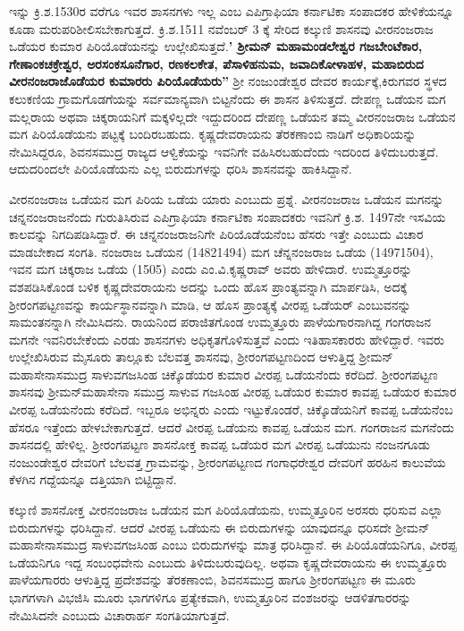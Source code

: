 ಇನ್ನು ಕ್ರಿ.ಶ.1530ರ ವರೆಗೂ ಇವರ ಶಾಸನಗಳು ಇಲ್ಲ ಎಂಬ ಎಪಿಗ್ರಾಫಿಯಾ ಕರ್ನಾಟಿಕಾ ಸಂಪಾದಕರ ಹೇಳಿಕೆಯನ್ನೂ ಕೂಡಾ ಮರುಪರಿಶೀಲಿಸಬೇಕಾಗುತ್ತದೆ. ಕ್ರಿ.ಶ.1511 ನವೆಂಬರ್​ 3 ಕ್ಕೆ ಸೇರಿದ ಕಲ್ಕುಣಿ ಶಾಸನವು ವೀರನಂಜರಾಜ ಒಡೆಯರ ಕುಮಾರ ಪಿರಿಯೊಡೆಯನನ್ನು ಉಲ್ಲೇಖಿಸುತ್ತದೆ.\textbf{' ಶ‍್ರೀಮನ್​ ಮಹಾಮಂಡಲೇಶ್ವರ ಗಜಬೇಂಟೆಕಾರ, ಗೇಣಾಂಕಚಕ್ರೇಶ್ವರ, ಅರಸಂಕಸೂನೆಗಾರ, ರಣಕಲಕೇತ, ಪೆಸಾಳಿಹನುಮ, ಜವಾದಿಕೋಳಾಹಳ, ಮಹಾಬಿರುದ\general{\break } ವೀರನಂಜರಾಜೊಡೆಯರ ಕುಮಾರರು ಪಿರಿಯೊಡೆಯರು''} ಶ‍್ರೀ ನಂಜುಂಡೇಶ್ವರ ದೇವರ ಕಾರ್ಯಕ್ಕೆ,ಕಿರುಗವರ ಸ್ಥಳದ ಕಲುಕಣಿಯ ಗ್ರಾಮಗೊಡಗೆಯನ್ನು ಸರ್ವಮಾನ್ಯವಾಗಿ ಬಿಟ್ಟನೆಂದು ಈ ಶಾಸನ ತಿಳಿಸುತ್ತದೆ. ದೇಪಣ್ಣ ಒಡೆಯನ ಮಗ ಮಲ್ಲರಾಯ ಅಥವಾ ಚಿಕ್ಕರಾಯನಿಗೆ ಮಕ್ಕಳಿಲ್ಲದೇ ಇದ್ದುದರಿಂದ ದೇಪಣ್ಣ ಒಡೆಯನ ತಮ್ಮ ವೀರನಂಜರಾಜ ಒಡೆಯನ ಮಗ ಪಿರಿಯೊಡೆಯನು ಪಟ್ಟಕ್ಕೆ ಬಂದಿರಬಹುದು. ಕೃಷ್ಣದೇವರಾಯನು ತೆರಕಣಾಂಬಿ ನಾಡಿಗೆ ಅಧಿಕಾರಿಯನ್ನು ನೇಮಿಸಿದ್ದರೂ, ಶಿವನಸಮುದ್ರ ರಾಜ್ಯದ ಆಳ್ವಿಕೆಯನ್ನು ಇವನಿಗೇ ವಹಿಸಿರಬಹುದೆಂದು ಇದರಿಂದ ತಿಳಿದುಬರುತ್ತದೆ. ಆದುದರಿಂದಲೇ ಪಿರಿಯೊಡೆಯನು ಎಲ್ಲ ಬಿರುದುಗಳನ್ನು ಧರಿಸಿ ಶಾಸನವನ್ನು ಹಾಕಿಸಿದ್ದಾನೆ.

ವೀರನಂಜರಾಜ ಒಡೆಯನ ಮಗ ಪಿರಿಯ ಒಡೆಯ ಯಾರು ಎಂಬುದು ಪ್ರಶ್ನೆ. ವೀರನಂಜರಾಜ ಒಡೆಯನ ಮಗನನ್ನು ಚನ್ನನಂಜರಾಜನೆಂದು ಗುರುತಿಸಿರುವ ಎಪಿಗ್ರಾಫಿಯಾ ಕರ್ನಾಟಿಕಾ ಸಂಪಾದಕರು ಇವನಿಗೆ ಕ್ರಿ.ಶ. 1497ನೇ ಇಸವಿಯ ಕಾಲವನ್ನು ನಿಗದಿಪಡಿಸಿದ್ದಾರೆ. ಈ ಚನ್ನನಂಜರಾಜನಿಗೇ ಪಿರಿಯೊಡೆಯನೆಂಬ ಹೆಸರು ಇತ್ತೇ ಎಂಬುದು ವಿಚಾರ ಮಾಡಬೇಕಾದ ಸಂಗತಿ. ನಂಜರಾಜ ಒಡೆಯನ (1482\enginline{-}1494) ಮಗ ಚೆನ್ನನಂಜರಾಜ ಒಡೆಯ (1497\enginline{-}1504), ಇವನ ಮಗ ಚಿಕ್ಕರಾಜ ಒಡೆಯ (1505) ಎಂದು ಎಂ.ವಿ.ಕೃಷ್ಣರಾವ್​ ಅವರು ಹೇಳಿದಾರೆ. ಉಮ್ಮತ್ತೂರನ್ನು ವಶಪಡಿಸಿಕೊಂಡ ಬಳಿಕ ಕೃಷ್ಣದೇವರಾಯನು ಅದನ್ನು ಒಂದು ಹೊಸ ಪ್ರಾಂತ್ಯವನ್ನಾಗಿ ಮಾರ್ಪಡಿಸಿ, ಅದಕ್ಕೆ ಶ‍್ರೀರಂಗಪಟ್ಟಣವನ್ನು ಕಾರ್ಯಸ್ಥಾನವನ್ನಾಗಿ ಮಾಡಿ, ಆ ಹೊಸ ಪ್ರಾಂತ್ಯಕ್ಕೆ ವೀರಪ್ಪ ಒಡೆಯರ್​ ಎಂಬುವನನ್ನು ಸಾಮಂತನನ್ನಾಗಿ ನೇಮಿಸಿದನು. ರಾಯನಿಂದ ಪರಾಜಿತಗೊಂಡ ಉಮ್ಮತ್ತೂರು ಪಾಳೆಯಗಾರನಾಗಿದ್ದ ಗಂಗರಾಜನ ಮಗನೇ ಇವನಿರಬೇಕೆಂದು ಎರಡು ಶಾಸನಗಳು ಅಧಿಕೃತಗೊಳಿಸುತ್ತವೆ ಎಂದು ಇತಿಹಾಸಕಾರರು ಹೇಳಿದ್ದಾರೆ. ಇವರು ಉಲ್ಲೇಖಿಸಿರುವ ಮೈಸೂರು ತಾಲ್ಲೂಕು ಬೆಲವತ್ತ ಶಾಸನವು, ಶ‍್ರೀರಂಗಪಟ್ಟಣದಿಂದ ಆಳುತ್ತಿದ್ದ ಶ‍್ರೀಮನ್​ ಮಹಾಸೇನಾಸಮುದ್ರ ಸಾಳುವಗಜಸಿಂಹ ಚಿಕ್ಕೊಡೆಯರ ಕುಮಾರ ವೀರಪ್ಪ ಒಡೆಯನೆಂದು ಕರೆದಿದೆ. ಶ‍್ರೀರಂಗಪಟ್ಟಣ ಶಾಸನವು ಶ‍್ರೀಮನ್​ ಮಹಾಸೇನಾ ಸಮುದ್ರ ಸಾಳುವ ಗಜಸಿಂಹ ವೀರಪ್ಪ ಒಡೆಯರ ಕುಮಾರ ಕಾವಪ್ಪ ಒಡೆಯರ ಕುಮಾರ ವೀರಪ್ಪ ಒಡೆಯನೆಂದು ಕರೆದಿದೆ. ಇಬ್ಬರೂ ಅಭಿನ್ನರು ಎಂದು ಇಟ್ಟುಕೊಂಡರೆ, ಚಿಕ್ಕೊಡೆಯನಿಗೆ ಕಾವಪ್ಪ ಒಡೆಯನೆಂಬ ಹೆಸರೂ ಇತ್ತೆಂದು ಹೇಳಬೇಕಾಗುತ್ತದೆ. ಆದರೆ ವೀರಪ್ಪ ಒಡೆಯನು ಕಾವಪ್ಪ ಒಡೆಯನ ಮಗ. ಗಂಗರಾಜನ ಮಗನೆಂದು ಶಾಸನದಲ್ಲಿ ಹೇಳಿಲ್ಲ. ಶ‍್ರೀರಂಗಪಟ್ಟಣ ಶಾಸನೋಕ್ತ ಕಾವಪ್ಪ ಒಡೆಯರ ಮಗ ವೀರಪ್ಪ ಒಡೆಯುನು ನಂಜನಗೂಡು ನಂಜುಂಡೇಶ್ವರ ದೇವರಿಗೆ ಬೆಲವತ್ತ ಗ್ರಾಮವನ್ನು, ಶ‍್ರೀರಂಗಪಟ್ಟಣದ ಗಂಗಾಧರೇಶ್ವರ ದೇವರಿಗೆ ಹರಹಿನ ಕಾಲುವೆಯ ಕೆಳಗಿನ ಗದ್ದೆಯನ್ನೂ ದತ್ತಿಯಾಗಿ ಬಿಟ್ಟಿದ್ದಾನೆ.

ಕಲ್ಕುಣಿ ಶಾಸನೋಕ್ತ ವೀರನಂಜರಾಜ ಒಡೆಯನ ಮಗ ಪಿರಿಯೊಡೆಯನು, ಉಮ್ಮತ್ತೂರಿನ ಅರಸರು ಧರಿಸುವ ಎಲ್ಲಾ ಬಿರುದುಗಳನ್ನು ಧರಿಸಿದ್ದಾನೆ. ಆದರೆ ವೀರಪ್ಪ ಒಡೆಯನು ಈ ಬಿರುದುಗಳನ್ನು ಯಾವುದನ್ನೂ ಧರಿಸದೇ ಶ‍್ರೀಮನ್​ ಮಹಾಸೇನಾಸಮುದ್ರ ಸಾಳುವಗಜಸಿಂಹ ಎಂಬು ಬಿರುದುಗಳನ್ನು ಮಾತ್ರ ಧರಿಸಿದ್ದಾನೆ. ಈ ಪಿರಿಯೊಡೆಯನಿಗೂ, ವೀರಪ್ಪ ಒಡೆಯನಿಗೂ ಇದ್ದ ಸಂಬಂಧವೇನು ಎಂಬುದು ತಿಳಿದುಬರುವುದಿಲ್ಲ. ಅಥವಾ ಕೃಷ್ಣದೇವರಾಯನು ಈ ಉಮ್ಮತ್ತೂರು ಪಾಳೆಯಗಾರರು ಆಳುತ್ತಿದ್ದ ಪ್ರದೇಶವನ್ನು ತೆರಕಣಾಂಬಿ, ಶಿವನಸಮುದ್ರ ಹಾಗೂ ಶ‍್ರೀರಂಗಪಟ್ಟಣ ಈ ಮೂರು ಭಾಗಗಳಾಗಿ ವಿಭಜಿಸಿ ಮೂರು ಭಾಗಗಳಿಗೂ ಪ್ರತ್ಯೇಕವಾಗಿ, ಉಮ್ಮತ್ತೂರಿನ ವಂಶಜರನ್ನು ಆಡಳಿತಗಾರರನ್ನು ನೇಮಿಸಿದನೇ ಎಂಬುದು ವಿಚಾರಾರ್ಹ ಸಂಗತಿಯಾಗುತ್ತದೆ.

